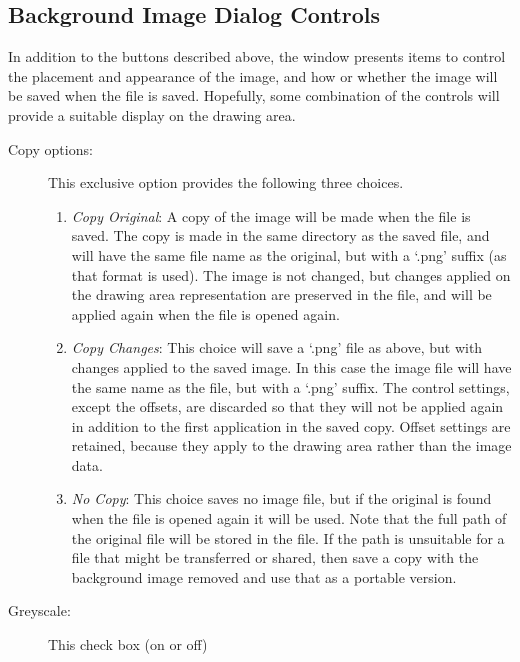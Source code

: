 		\subsection{Background Image Dialog Controls}%
		\label{ssec:bg_image_controls}
		In addition to the buttons described above,
		the   window
		presents items to control the placement and
		appearance of the image, and how or whether
		the image will be saved when the \IXpkg{} file
		is saved. Hopefully, some combination of the
		controls will provide a suitable display on the
		drawing area.

		\begin{description}
		  \item[Copy options:] This exclusive option
		  provides the following three choices.
			\begin{enumerate}
			  \item \emph{Copy Original}: A
			  copy of the image will be made when the
			  \IXpkg{} file is saved. The copy is made in
			  the same directory as the saved \IXpkg{} file,
			  and will have the same file name as the original,
			  but with a
			  `.png' suffix (as that format is used).  The
			  image is not changed, but changes applied on the
			  drawing area representation are preserved in
			  the \IXpkg{} file, and will be applied again when
			  the \IXpkg{} file is opened again.
			  \item \emph{Copy Changes}: This
			  choice will save a `.png'
			  file as above, but with changes applied to
			  the saved image. In this case the image
			  file will have the same name as the \IXpkg{} file,
			  but with a `.png' suffix. The 
			  control settings, except the offsets,
			  are discarded so that they will not be applied
			  again in addition to the first application
			  in the saved copy. Offset settings are retained,
			  because they apply to the drawing area rather
			  than the image data.
			  \item \emph{No Copy}: This choice
			  saves no image file, but if the
			  original is found when the \IXpkg{} file is
			  opened again it will be used. Note that the
			  full path of the original file will be stored
			  in the \IXpkg{} file. If the path is unsuitable
			  for a file that might be transferred or shared,
			  then save a copy with the background image
			  removed and use that as a portable version.
			\end{enumerate}
		  \item[Greyscale:] This check box (on or off)

\end{description}

